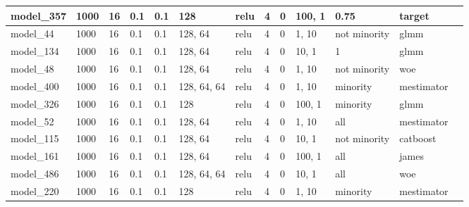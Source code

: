 \begin{tabular}{|l|l|l|l|l|l|l|l|l|l|l|l|l|}
model\_357     & 1000           & 16           & 0.1          & 0.1          & 128         & relu         & 4           & 0            & 100, 1           & 0.75                        & target            &           \\ \hline
model\_44      & 1000           & 16           & 0.1          & 0.1          & 128, 64     & relu         & 4           & 0            & 1, 10            & not minority                & glmm              &           \\ \hline
model\_134     & 1000           & 16           & 0.1          & 0.1          & 128, 64     & relu         & 4           & 0            & 10, 1            & 1                           & glmm              &           \\ \hline
model\_48      & 1000           & 16           & 0.1          & 0.1          & 128, 64     & relu         & 4           & 0            & 1, 10            & not minority                & woe               &           \\ \hline
model\_400     & 1000           & 16           & 0.1          & 0.1          & 128, 64, 64 & relu         & 4           & 0            & 1, 10            & minority                    & mestimator        &           \\ \hline
model\_326     & 1000           & 16           & 0.1          & 0.1          & 128         & relu         & 4           & 0            & 100, 1           & minority                    & glmm              &           \\ \hline
model\_52      & 1000           & 16           & 0.1          & 0.1          & 128, 64     & relu         & 4           & 0            & 1, 10            & all                         & mestimator        &           \\ \hline
model\_115     & 1000           & 16           & 0.1          & 0.1          & 128, 64     & relu         & 4           & 0            & 10, 1            & not minority                & catboost          &           \\ \hline
model\_161     & 1000           & 16           & 0.1          & 0.1          & 128, 64     & relu         & 4           & 0            & 100, 1           & all                         & james             &           \\ \hline
model\_486     & 1000           & 16           & 0.1          & 0.1          & 128, 64, 64 & relu         & 4           & 0            & 10, 1            & all                         & woe               &           \\ \hline
model\_220     & 1000           & 16           & 0.1          & 0.1          & 128         & relu         & 4           & 0            & 1, 10            & minority                    & mestimator        &           \\ \hline
\end{tabular}